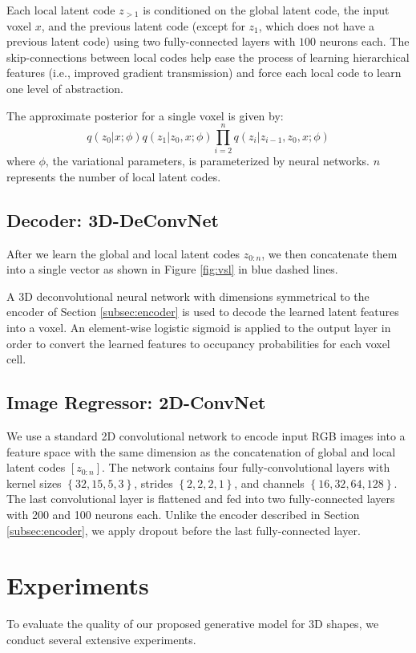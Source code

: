 \documentclass[10pt,twocolumn,letterpaper]{article}
\begin{document}
Each local latent code $z_{>1}$ is conditioned on the global latent code, the input voxel $x$, and the previous latent code (except for $z_1$, which does not have a previous latent code) using two fully-connected layers with $100$ neurons each. The skip-connections between local codes help ease the process of learning hierarchical features (i.e., improved gradient transmission) and force each local code to learn one level of abstraction.

The approximate posterior for a single voxel is given by:
\begin{equation}
      q(z_0|x;\phi)q(z_1|z_0,x;\phi) \prod_{i=2}^n q(z_i|z_{i-1},z_0,x;\phi)
\end{equation}
where $\phi$, the variational parameters, is parameterized by neural networks. $n$ represents the number of local latent codes.

\subsection{Decoder: 3D-DeConvNet}
\label{subsec:decoder}
After we learn the global and local latent codes $z_{0:n}$, we then concatenate them into a single vector as shown in Figure \ref{fig:vsl} in blue dashed lines.

A 3D deconvolutional neural network with dimensions symmetrical to the encoder of Section \ref{subsec:encoder} is used to decode the learned latent features into a voxel. An element-wise logistic sigmoid is applied to the output layer in order to convert the learned features to occupancy probabilities for each voxel cell.

\subsection{Image Regressor: 2D-ConvNet}
We use a standard 2D convolutional network to encode input RGB images into a feature space with the same dimension as the concatenation of global and local latent codes $[z_{0:n}]$. The network contains four fully-convolutional layers with kernel sizes $\left\{32, 15, 5, 3 \right\}$, strides $\left\{2,2,2,1 \right\}$, and channels $\left\{16, 32, 64, 128  \right\}$. The last convolutional layer is flattened and fed into two fully-connected layers with 200 and 100 neurons each. Unlike the encoder described in Section \ref{subsec:encoder}, we apply dropout \cite{srivastava2014dropout} before the last fully-connected layer.

\section{Experiments}
\label{sec:3dshape}
To evaluate the quality of our proposed generative model for 3D shapes, we conduct several extensive experiments.
\end{document}
